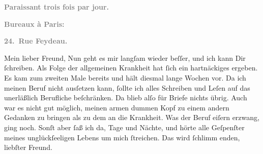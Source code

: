 \pstart
           \begin{otherlanguage}{french}\textcolor{gray}{\textbf{\textbf{Paraissant trois fois par jour.}}}\end{otherlanguage}\pend
           
\pstart
           \begin{otherlanguage}{french}\textcolor{gray}{\textbf{\textbf{Bureaux à Paris:}}}\end{otherlanguage}\pend
           
\pstart
           \begin{otherlanguage}{french}\textcolor{gray}{\textbf{\textbf{24. Rue Feydeau.}}}\end{otherlanguage}\pend
           
\pstart{}Mein lieber Freund,\pend\vspace{0.5em}
\pstart
           Nun geht es mir langſam wieder beſſer, und ich kann Dir{ }ſchreiben. Als Folge der
               allgemeinen Krankheit hat{ }ſich ein hartnäckiges \label{K_L02729-1v}\label{K_L02729-1}
               ergeben. Es kam zum zweiten Male bereits und hält diesmal lange Wochen vor. Da ich
               meinen Beruf nicht ausſetzen kann,{ }ſollte ich alles Schreiben und Leſen auf das
               unerläßlich Berufliche beſchränken. Da blieb alſo für Briefe nichts übrig. Auch war
               es nicht gut möglich, meinen armen dummen Kopf zu einem andern Gedanken zu bringen
               als zu dem an die Krankheit. Was der Beruf eiſern {\pb}erzwang,  ging noch. Sonſt aber{ }ſaß ich da,
               Tage und Nächte, und hörte alle Geſpenſter meines unglückſeeligen Lebens um mich{ }ſtreichen. Das wird{ }ſchlimm enden, liebſter Freund.\pend
           
